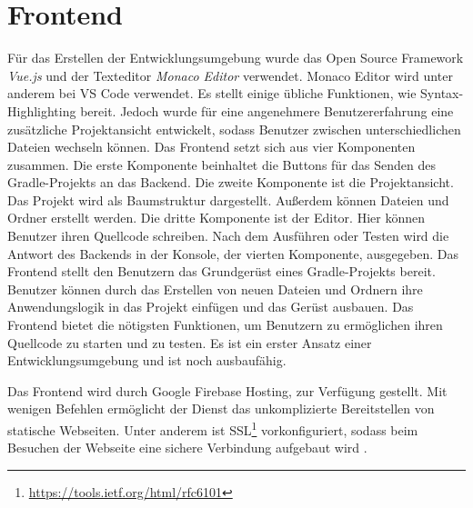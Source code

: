 \section{Frontend}
Für das Erstellen der Entwicklungsumgebung wurde das Open Source Framework \emph{Vue.js}
und der Texteditor \emph{Monaco Editor} verwendet. Monaco Editor wird unter anderem
bei VS Code verwendet. Es stellt einige übliche Funktionen,
wie Syntax-Highlighting \cite{MonacoEditor} bereit.
Jedoch wurde für eine angenehmere Benutzererfahrung eine zusätzliche Projektansicht
entwickelt, sodass Benutzer zwischen unterschiedlichen Dateien wechseln können.
Das Frontend setzt sich aus vier Komponenten zusammen. Die erste Komponente beinhaltet
die Buttons für das Senden des Gradle-Projekts an das Backend. Die zweite Komponente
ist die Projektansicht. Das Projekt wird als Baumstruktur dargestellt. Außerdem können
Dateien und Ordner erstellt werden. Die dritte Komponente ist der Editor. Hier
können Benutzer ihren Quellcode schreiben. Nach dem Ausführen oder Testen wird die Antwort
des Backends in der Konsole, der vierten Komponente, ausgegeben.
Das Frontend stellt den Benutzern das Grundgerüst eines Gradle-Projekts bereit.
Benutzer können durch das Erstellen von neuen Dateien und Ordnern ihre
Anwendungslogik in das Projekt einfügen und das Gerüst ausbauen. Das Frontend bietet
die nötigsten Funktionen, um Benutzern zu ermöglichen ihren Quellcode
zu starten und zu testen. Es ist ein erster Ansatz einer Entwicklungsumgebung
und ist noch ausbaufähig.

Das Frontend wird durch Google Firebase Hosting, zur Verfügung gestellt.
Mit wenigen Befehlen ermöglicht der Dienst das unkomplizierte Bereitstellen von statische Webseiten.
Unter anderem ist SSL\footnote{\url{https://tools.ietf.org/html/rfc6101}}
vorkonfiguriert, sodass beim Besuchen der Webseite eine sichere
Verbindung aufgebaut wird \cite{FirebaseHosting}.


